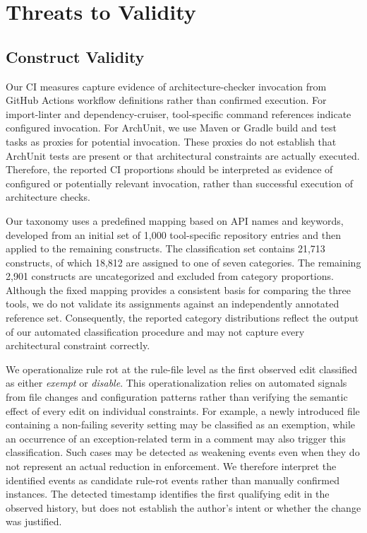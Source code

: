 \section{Threats to Validity}
\label{sec:threats}

\subsection{Construct Validity}
\label{sec:threats-construct}

Our CI measures capture evidence of architecture-checker invocation
from GitHub Actions workflow definitions rather than confirmed
execution. For import-linter and dependency-cruiser, tool-specific
command references indicate configured invocation. For ArchUnit,
we use Maven or Gradle build and test tasks as proxies for potential
invocation. These proxies do not establish that ArchUnit tests are
present or that architectural constraints are actually executed.
Therefore, the reported CI proportions should be interpreted as
evidence of configured or potentially relevant invocation, rather
than successful execution of architecture checks.

Our taxonomy uses a predefined mapping based on API names and
keywords, developed from an initial set of 1,000 tool-specific
repository entries and then applied to the remaining constructs.
The classification set contains 21,713 constructs, of which
18,812 are assigned to one of seven categories. The remaining
2,901 constructs are uncategorized and excluded from category
proportions. Although the fixed mapping provides a consistent
basis for comparing the three tools, we do not validate its
assignments against an independently annotated reference set.
Consequently, the reported category distributions reflect the
output of our automated classification procedure and may not
capture every architectural constraint correctly.

We operationalize rule rot at the rule-file level as the first
observed edit classified as either \emph{exempt} or \emph{disable}.
This operationalization relies on automated signals from file
changes and configuration patterns rather than verifying the
semantic effect of every edit on individual constraints. For
example, a newly introduced file containing a non-failing severity
setting may be classified as an exemption, while an occurrence
of an exception-related term in a comment may also trigger this
classification. Such cases may be detected as weakening events
even when they do not represent an actual reduction in enforcement.
We therefore interpret the identified events as candidate rule-rot
events rather than manually confirmed instances. The detected
timestamp identifies the first qualifying edit in the observed
history, but does not establish the author's intent or whether
the change was justified.

